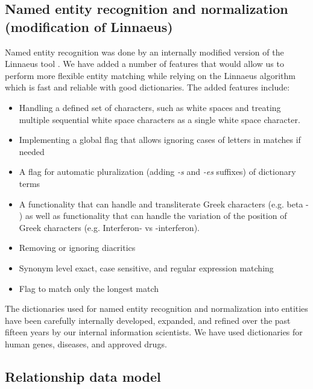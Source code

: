 \documentclass[final,12pt,3p,times,twocolumn,authoryear]{elsarticle}
\begin{document}
\subsection{Named entity recognition and normalization (modification of Linnaeus)}

Named entity recognition was done by an internally modified version of the Linnaeus tool \citep{gerner2010linnaeus}. We have added a number of features that would allow us to perform more flexible entity matching while relying on the Linnaeus algorithm which is fast and reliable with good dictionaries. The added features include: 
\begin{itemize}
    \item Handling a defined set of characters, such as white spaces and treating multiple sequential white space characters as a single white space character. 
    \item Implementing a global flag that allows ignoring cases of letters in matches if needed
    \item A flag for automatic pluralization (adding \textit{-s} and \textit{-es} suffixes) of dictionary terms
    \item A functionality that can handle and transliterate Greek characters (e.g. beta - ) as well as functionality that can handle the variation of the position of Greek characters (e.g. Interferon- vs  -interferon).
    \item Removing or ignoring diacritics
    \item Synonym level exact, case sensitive, and regular expression matching
    \item Flag to match only the longest match
\end{itemize}

The dictionaries used for named entity recognition and normalization into entities have been carefully internally developed, expanded, and refined over the past fifteen years by our internal information scientists. We have used dictionaries for human genes, diseases, and approved drugs. 
 

\subsection{Relationship data model}
\end{document}
